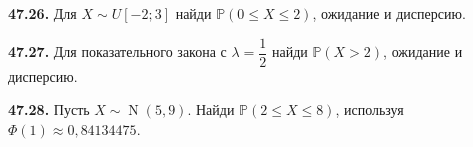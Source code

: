 \noindent\begin{minipage}[t]{\linewidth}\textbf{47.26.} Для \(X\sim U[-2;3]\) найди \(\mathbb P(0\le X\le2)\), ожидание и дисперсию.\par\end{minipage}\par
\noindent\begin{minipage}[t]{\linewidth}\textbf{47.27.} Для показательного закона с \(\lambda=\dfrac12\) найди \(\mathbb P(X>2)\), ожидание и дисперсию.\par\end{minipage}\par
\noindent\begin{minipage}[t]{\linewidth}\textbf{47.28.} Пусть \(X\sim\operatorname N(5,9)\). Найди \(\mathbb P(2\le X\le8)\), используя \(\Phi(1)\approx0{,}84134475\).\par\end{minipage}\par
\endgroup
